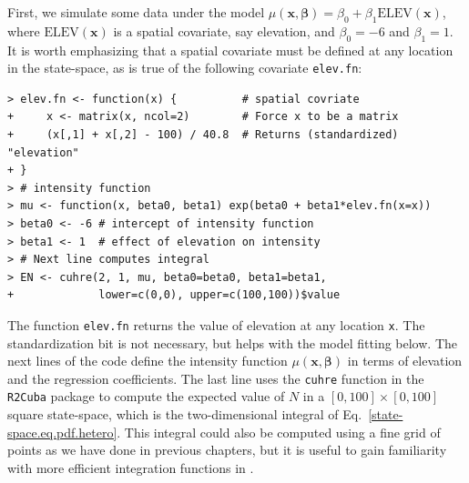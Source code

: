 First, we simulate some data under the model $\mu(\mathbf{x},
\bm{\beta}) = \beta_0 + \beta_1\mathrm{ELEV}(\mathbf{x})$, where
$\mathrm{ELEV}(\mathbf{x})$ is a spatial covariate, say
elevation, and $\beta_0=-6$ and $\beta_1=1$. It is worth emphasizing
that a spatial covariate must be defined at any location in the
state-space, as is true of the following covariate \verb+elev.fn+:
  \begin{small}
\begin{verbatim}
> elev.fn <- function(x) {          # spatial covriate
+     x <- matrix(x, ncol=2)        # Force x to be a matrix
+     (x[,1] + x[,2] - 100) / 40.8  # Returns (standardized) "elevation"
+ }
> # intensity function
> mu <- function(x, beta0, beta1) exp(beta0 + beta1*elev.fn(x=x))
> beta0 <- -6 # intercept of intensity function
> beta1 <- 1  # effect of elevation on intensity
> # Next line computes integral
> EN <- cuhre(2, 1, mu, beta0=beta0, beta1=beta1,
+             lower=c(0,0), upper=c(100,100))$value
\end{verbatim}
\end{small}
The function \texttt{elev.fn} returns the value of elevation at any
location \verb+x+. The standardization bit is not necessary,
but helps with the model fitting below. The next lines of the code define the
intensity function $\mu(\mathbf{x}, \bm{\beta})$ in terms of elevation
and the regression coefficients. The last line uses the \verb+cuhre+ function in
the {\tt R2Cuba} package \citep{hahn_etal:2011} to compute the
expected value of $N$ in a $[0,100]\times[0,100]$ square state-space, which is the
two-dimensional integral of Eq.~\ref{state-space.eq.pdf.hetero}. This
integral could also be computed using a fine grid of points as we have done in previous
chapters, but it is useful to gain familiarity with more efficient
integration functions in \R.

